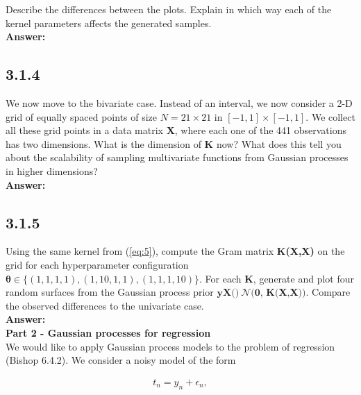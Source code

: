 \documentclass[a4paper]{article}
\begin{document}
Describe the differences between the plots. Explain in which way each of the kernel parameters affects the generated samples.\\


\textbf{Answer:}\\





\subsection*{3.1.4}

We now move to the bivariate case. Instead of an interval, we now consider a 2-D grid of equally spaced points of size $N = 21 \times 21$ in $[-1,1] \times [-1,1]$. We collect all these grid points in a data matrix \textbf{X}, where each one of the 441 observations has two dimensions. What is the dimension of \textbf{K} now? What does this tell you about the scalability of sampling multivariate functions from Gaussian processes in higher dimensions?\\

\textbf{Answer:}\\






\subsection*{3.1.5}

Using the same kernel from (\ref{eq:5}), compute the Gram matrix \textbf{K(X,X)} on the grid for each hyperparameter configuration $\boldsymbol{\theta} \in \{(1, 1, 1, 1), (1, 10, 1, 1), (1, 1, 1, 10)\}$. For each \textbf{K}, generate and plot four random surfaces from the Gaussian process prior $\textbf{yX()} ~\mathcal{N}\textbf{(0, K(X,X)})$. Compare the observed differences to the univariate case.\\


\textbf{Answer:}\\








\textbf{Part 2 - Gaussian processes for regression}\\

We would like to apply Gaussian process models to the problem of regression (Bishop 6.4.2). We consider a noisy model of the form 

\begin{align*}
t_n = y_n + \epsilon_n,
\end{align*}
\end{document}
